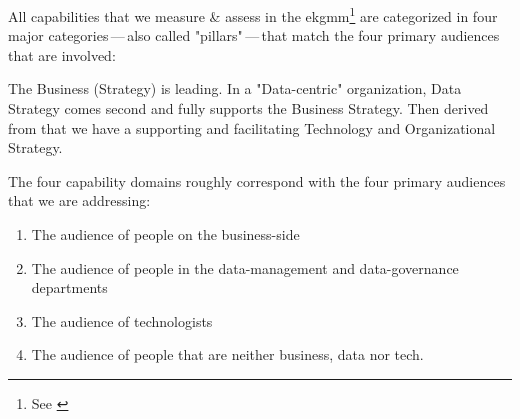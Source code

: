 %
%
\label{sec:the-four-capability-domains}
All capabilities that we measure \& assess in the \gls{ekgmm}\footnote{See \cite{ekgmm}} are categorized
in four major categories\,---\,also called "pillars"\,---\,that match the four primary audiences that are involved:

The Business (Strategy) is leading.
In a "Data-centric" organization, Data Strategy comes second and
fully supports the Business Strategy.
Then derived from that we have a supporting and facilitating Technology and Organizational Strategy.

The four capability domains roughly correspond with the four primary audiences that we are addressing:

\begin{enumerate}
    \item The audience of people on the business-side
    \item The audience of people in the data-management and data-governance departments
    \item The audience of technologists
    \item The audience of people that are neither business, data nor tech.
\end{enumerate}
